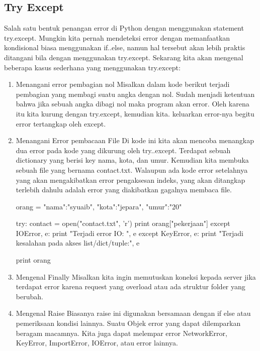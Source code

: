 \begin{enumerate}
\begin{enumerate}
\begin{enumerate}
\begin{enumerate}
\begin{enumerate}
\section{Try Except}
     Salah satu bentuk penangan error di Python dengan menggunakan statement try.except. Mungkin kita pernah mendeteksi error dengan memanfaatkan kondisional biasa menggunakan if..else, namun hal tersebut akan lebih praktis ditangani bila dengan menggunakan try.except.
     Sekarang kita akan mengenal beberapa kasus sederhana yang menggunakan try.except:
     \begin{enumerate}
         \item Menangani error pembagian nol Misalkan dalam kode berikut terjadi pembagian yang membagi suatu angka dengan nol. Sudah menjadi ketentuan bahwa jika sebuah angka dibagi nol maka program akan error. Oleh karena itu kita kurung dengan try.except, kemudian kita. keluarkan error-nya begitu error tertangkap oleh except.
    \item Menangani Error pembacaan File Di kode ini kita akan mencoba menangkap dua error pada kode yang dikurung oleh try..except. Terdapat sebuah dictionary yang berisi key nama, kota, dan umur. Kemudian kita membuka sebuah file yang bernama contact.txt. Walaupun ada kode error setelahnya yang akan mengakibatkan error pengaksesan indeks, yang akan ditangkap terlebih dahulu adalah error yang diakibatkan gagalnya membaca file.

orang = {"nama":"syuaib", "kota":"jepara", "umur":"20"}

try:
    contact = open("contact.txt", 'r')
    print orang["pekerjaan"]
except IOError, e:
    print "Terjadi error IO: ", e
except KeyError, e:
    print "Terjadi kesalahan pada akses list/dict/tuple:", e

print orang
  \item Mengenal Finally Misalkan kita  ingin memutuskan koneksi kepada server jika terdapat error karena request yang overload atau ada struktur folder yang berubah. 
  \item Mengenal Raise Biasanya raise ini digunakan bersamaan dengan if else atau pemeriksaan kondisi lainnya.  Suatu Objek error yang dapat dilemparkan beragam macamnya. Kita juga dapat melempar error NetworkError, KeyError, ImportError, IOError, atau error lainnya. 
     \end{enumerate}


  
    
     \end{enumerate}

     \end{enumerate}
     
        
    \end{enumerate}
    \end{enumerate}
    
    
\end{enumerate}

